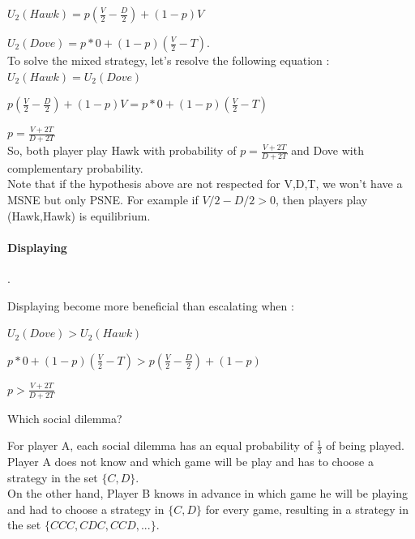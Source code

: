 \documentclass[11pt]{article}
\newenvironment{exercise}[2][Exercise]{\begin{trivlist}
\item[\hskip \labelsep {\bfseries #1}\hskip \labelsep {\bfseries #2.}]}{\end{trivlist}}
\begin{document}
$U_2 (Hawk) = p (\frac{V}{2}-\frac{D}{2}) + (1-p) V$ 

\vspace{2mm}
$U_2 (Dove) = p * 0 + (1-p)(\frac{V}{2}-T)$.\\

To solve the mixed strategy, let's resolve the following equation : \\

$U_2 (Hawk) = U_2 (Dove)$

\vspace{2mm}
$p (\frac{V}{2}-\frac{D}{2}) + (1-p) V = p * 0 + (1-p)(\frac{V}{2}-T)$

\vspace{2mm}
$ p = \frac{V+2T}{D+2T}$ \\

So, both player play Hawk with probability of $ p = \frac{V+2T}{D+2T}$ and Dove with complementary probability. \\

Note that if the hypothesis above are not respected for V,D,T, we won't have a MSNE but only PSNE. For example if $V/2-D/2>0$, then players play (Hawk,Hawk) is equilibrium.

\paragraph{Displaying} 

.

Displaying become more beneficial than escalating when :

\vspace{2mm}
$U_2 (Dove) > U_2 (Hawk)$

\vspace{2mm}
$p * 0 + (1-p)(\frac{V}{2}-T) > p (\frac{V}{2}-\frac{D}{2}) + (1-p) $

\vspace{2mm}
$p > \frac{V+2T}{D+2T} $



\begin{exercise}{2} Which social dilemma?
\end{exercise}

For player A, each social dilemma has an equal probability of $\frac{1}{3}$ of being played. Player A does not know and which game will be play and has to choose a strategy in the set $\{C, D \}$. \\

On the other hand, Player B knows in advance in which game he will be playing and had to choose a strategy in $\{C, D \}$ for every game, resulting in a strategy in the set $\{ CCC, CDC, CCD, ... \}$. \\
\end{document}
